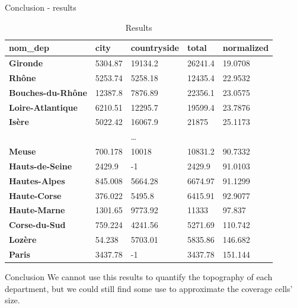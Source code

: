 \begin{frame}{Conclusion - results}
    \begin{table}[!ht]
        \tiny
        \centering
        \begin{tabular}{lllll}
        \hline
            \textbf{nom\_dep} & \textbf{city} & \textbf{countryside} & \textbf{total} & \textbf{normalized} \\ \hline
            \textbf{Gironde} & 5304.87 & 19134.2 & 26241.4 & 19.0708 \\ 
            \textbf{Rhône} & 5253.74 & 5258.18 & 12435.4 & 22.9532 \\ 
            \textbf{Bouches-du-Rhône} & 12387.8 & 7876.89 & 22356.1 & 23.0575 \\ 
            \textbf{Loire-Atlantique} & 6210.51 & 12295.7 & 19599.4 & 23.7876 \\ 
            \textbf{Isère} & 5022.42 & 16067.9 & 21875 & 25.1173 \\ 
             & & \dots & & \\
            \textbf{Meuse} & 700.178 & 10018 & 10831.2 & 90.7332 \\ 
            \textbf{Hauts-de-Seine} & 2429.9 & -1 & 2429.9 & 91.0103 \\ 
            \textbf{Hautes-Alpes} & 845.008 & 5664.28 & 6674.97 & 91.1299 \\ 
            \textbf{Haute-Corse} & 376.022 & 5495.8 & 6415.91 & 92.9077 \\ 
            \textbf{Haute-Marne} & 1301.65 & 9773.92 & 11333 & 97.837 \\ 
            \textbf{Corse-du-Sud} & 759.224 & 4241.56 & 5271.69 & 110.742 \\ 
            \textbf{Lozère} & 54.238 & 5703.01 & 5835.86 & 146.682 \\ 
            \textbf{Paris} & 3437.78 & -1 & 3437.78 & 151.144 \\ \hline
        \end{tabular}
        \caption{Results}
    \end{table}

    \begin{block}{Conclusion}
        We cannot use this results to quantify the topography of each department, but we could still find some use to approximate the coverage cells' size.
    \end{block}
\end{frame}